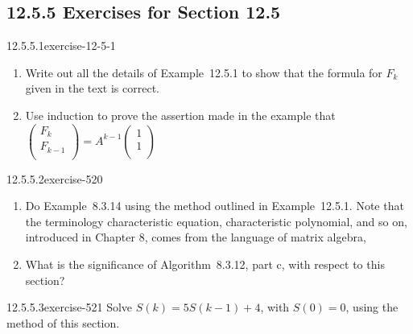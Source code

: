 \documentclass[twoside,10pt,]{book}
\numberwithin{equation}{section}
\begin{document}
\subsection*{12.5.5 Exercises for Section 12.5}
\begin{divisionsolution}{12.5.5.1}{}{exercise-12-5-1}%
\hypertarget{p-4685}{}%
\leavevmode%
\begin{enumerate}[label=(\alph*)]
\item\hypertarget{li-2132}{}\hypertarget{p-4686}{}%
Write out all the details of Example~12.5.1 to show that the formula for \(F_k\) given in the text is correct.%
\item\hypertarget{li-2133}{}\hypertarget{p-4687}{}%
Use induction to prove the assertion made in the example that \(\left(
\begin{array}{c}
F_k \\
F_{k-1} \\
\end{array}
\right)=A^{k-1} \left(
\begin{array}{c}
1 \\
1 \\
\end{array}
\right)\)%
\end{enumerate}
%
\end{divisionsolution}%
\begin{divisionsolution}{12.5.5.2}{}{exercise-520}%
\hypertarget{p-4688}{}%
\leavevmode%
\begin{enumerate}[label=(\alph*)]
\item\hypertarget{li-2134}{}\hypertarget{p-4689}{}%
Do Example~8.3.14  using the method outlined in Example~12.5.1. Note that the terminology characteristic equation, characteristic polynomial, and so on, introduced in Chapter 8, comes from the language of matrix algebra,%
\item\hypertarget{li-2135}{}\hypertarget{p-4690}{}%
What is the significance of Algorithm~8.3.12, part c, with respect to this section?%
\end{enumerate}
%
\end{divisionsolution}%
\begin{divisionsolution}{12.5.5.3}{}{exercise-521}%
\hypertarget{p-4691}{}%
Solve \(S(k) = 5S(k - 1) + 4\), with \(S(0) = 0\), using the method of this section.%
\end{divisionsolution}%
\end{document}
